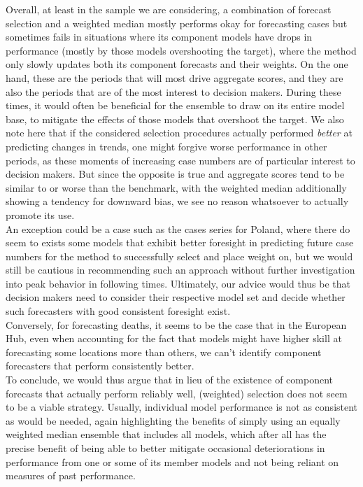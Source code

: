 Overall, at least in the sample we are considering, a combination of forecast selection and a weighted median mostly performs okay for forecasting cases but sometimes fails in situations where its component models have drops in performance (mostly by those models overshooting the target), where the method only slowly updates both its component forecasts and their weights. On the one hand, these are the periods that will most drive aggregate scores, and they are also the periods that are of the most interest to decision makers. During these times, it would often be beneficial for the ensemble to draw on its entire model base, to mitigate the effects of those models that overshoot the target. We also note here that if the considered selection procedures actually performed \textit{better} at predicting changes in trends, one might forgive worse performance in other periods, as these moments of increasing case numbers are of particular interest to decision makers. But since the opposite is true and aggregate scores tend to be similar to or worse than the benchmark, with the weighted median additionally showing a tendency for downward bias, we see no reason whatsoever to actually promote its use. \\
An exception could be a case such as the cases series for Poland, where there do seem to exists some models that exhibit better foresight in predicting future case numbers for the method to successfully select and place weight on, but we would still be cautious in recommending such an approach without further investigation into peak behavior in following times. Ultimately, our advice would thus be that decision makers need to consider their respective model set and decide whether such forecasters with good consistent foresight exist.\\ 
Conversely, for forecasting deaths, it seems to be the case that in the European Hub, even when accounting for the fact that models might have higher skill at forecasting some locations more than others, we can't identify component forecasters that perform consistently better.\medskip\\ 
To conclude, we would thus argue that in lieu of the existence of component forecasts that actually perform reliably well, (weighted) selection does not seem to be a viable strategy. Usually, individual model performance is not as consistent as would be needed, again highlighting the benefits of simply using an equally weighted median ensemble that includes all models, which after all has the precise benefit of being able to better mitigate occasional deteriorations in performance from one or some of its member models and not being reliant on measures of past performance.\\
